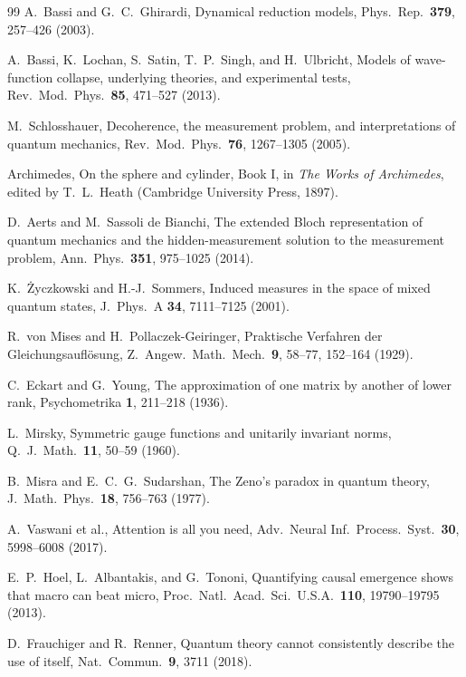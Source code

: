 \documentclass[aps,pra,onecolumn,superscriptaddress,nofootinbib,10pt]{revtex4-2}
\theoremstyle{definition}
\theoremstyle{remark}
\begin{document}
\begin{thebibliography}{99}
 A.~Bassi and G.~C.~Ghirardi, Dynamical reduction models, Phys.\ Rep.\ \textbf{379}, 257--426 (2003).

 A.~Bassi, K.~Lochan, S.~Satin, T.~P.~Singh, and H.~Ulbricht, Models of wave-function collapse, underlying theories, and experimental tests, Rev.\ Mod.\ Phys.\ \textbf{85}, 471--527 (2013).

 M.~Schlosshauer, Decoherence, the measurement problem, and interpretations of quantum mechanics, Rev.\ Mod.\ Phys.\ \textbf{76}, 1267--1305 (2005).

 Archimedes, On the sphere and cylinder, Book I, in \emph{The Works of Archimedes}, edited by T.~L.~Heath (Cambridge University Press, 1897).

 D.~Aerts and M.~Sassoli de Bianchi, The extended Bloch representation of quantum mechanics and the hidden-measurement solution to the measurement problem, Ann.\ Phys.\ \textbf{351}, 975--1025 (2014).

 K.~\.Zyczkowski and H.-J.~Sommers, Induced measures in the space of mixed quantum states, J.\ Phys.\ A \textbf{34}, 7111--7125 (2001).

 R.~von Mises and H.~Pollaczek-Geiringer, Praktische Verfahren der Gleichungsaufl\"osung, Z.\ Angew.\ Math.\ Mech.\ \textbf{9}, 58--77, 152--164 (1929).

 C.~Eckart and G.~Young, The approximation of one matrix by another of lower rank, Psychometrika \textbf{1}, 211--218 (1936).

 L.~Mirsky, Symmetric gauge functions and unitarily invariant norms, Q.\ J.\ Math.\ \textbf{11}, 50--59 (1960).

 B.~Misra and E.~C.~G.~Sudarshan, The Zeno's paradox in quantum theory, J.\ Math.\ Phys.\ \textbf{18}, 756--763 (1977).

 A.~Vaswani et al., Attention is all you need, Adv.\ Neural Inf.\ Process.\ Syst.\ \textbf{30}, 5998--6008 (2017).

 E.~P.~Hoel, L.~Albantakis, and G.~Tononi, Quantifying causal emergence shows that macro can beat micro, Proc.\ Natl.\ Acad.\ Sci.\ U.S.A.\ \textbf{110}, 19790--19795 (2013).

 D.~Frauchiger and R.~Renner, Quantum theory cannot consistently describe the use of itself, Nat.\ Commun.\ \textbf{9}, 3711 (2018).


\end{thebibliography}
\end{document}
